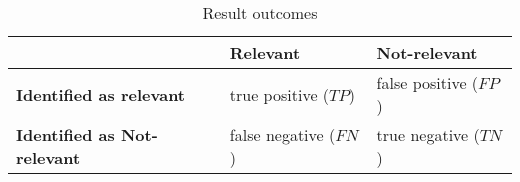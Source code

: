\begin{table}[H]
\centering    
\begin{scriptsize}
\begin{threeparttable}
\begin{tabular}{l|l|l}

\hline

\textbf{}
& \textbf{Relevant}    
& \textbf{Not-relevant} \\

\hline
\hline

\textbf{Identified as relevant} & true positive ($TP$) & false positive ($FP$) \\
\hline
\textbf{Identified as Not-relevant} & false negative ($FN$) & true negative ($TN$) \\
\hline

\end{tabular}
\end{threeparttable}
\end{scriptsize}
\caption{Result outcomes}
\label{tbl:type-I-II-errors}
\end{table}

    